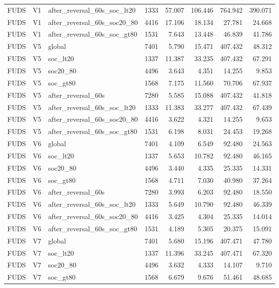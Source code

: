 \begin{tabular}{lllrrrrr}
FUDS & V1 & after\_reversal\_60s\_soc\_lt20 & 1333 & 57.007 & 106.446 & 764.942 & 390.071 \\
FUDS & V1 & after\_reversal\_60s\_soc20\_80 & 4416 & 17.106 & 18.134 & 27.781 & 24.668 \\
FUDS & V1 & after\_reversal\_60s\_soc\_gt80 & 1531 & 7.643 & 13.448 & 46.839 & 41.786 \\
FUDS & V5 & global & 7401 & 5.790 & 15.471 & 407.432 & 48.312 \\
FUDS & V5 & soc\_lt20 & 1337 & 11.387 & 33.235 & 407.432 & 67.291 \\
FUDS & V5 & soc20\_80 & 4496 & 3.643 & 4.351 & 14.255 & 9.853 \\
FUDS & V5 & soc\_gt80 & 1568 & 7.175 & 11.560 & 70.706 & 67.937 \\
FUDS & V5 & after\_reversal\_60s & 7280 & 5.585 & 15.088 & 407.432 & 41.818 \\
FUDS & V5 & after\_reversal\_60s\_soc\_lt20 & 1333 & 11.383 & 33.277 & 407.432 & 67.439 \\
FUDS & V5 & after\_reversal\_60s\_soc20\_80 & 4416 & 3.622 & 4.321 & 14.255 & 9.653 \\
FUDS & V5 & after\_reversal\_60s\_soc\_gt80 & 1531 & 6.198 & 8.031 & 24.453 & 19.268 \\
FUDS & V6 & global & 7401 & 4.109 & 6.549 & 92.480 & 24.563 \\
FUDS & V6 & soc\_lt20 & 1337 & 5.653 & 10.782 & 92.480 & 46.165 \\
FUDS & V6 & soc20\_80 & 4496 & 3.440 & 4.335 & 25.335 & 14.331 \\
FUDS & V6 & soc\_gt80 & 1568 & 4.711 & 7.030 & 40.980 & 37.264 \\
FUDS & V6 & after\_reversal\_60s & 7280 & 3.993 & 6.203 & 92.480 & 18.550 \\
FUDS & V6 & after\_reversal\_60s\_soc\_lt20 & 1333 & 5.649 & 10.790 & 92.480 & 46.339 \\
FUDS & V6 & after\_reversal\_60s\_soc20\_80 & 4416 & 3.425 & 4.304 & 25.335 & 14.014 \\
FUDS & V6 & after\_reversal\_60s\_soc\_gt80 & 1531 & 4.189 & 5.305 & 20.375 & 15.091 \\
FUDS & V7 & global & 7401 & 5.680 & 15.196 & 407.471 & 47.780 \\
FUDS & V7 & soc\_lt20 & 1337 & 11.396 & 33.245 & 407.471 & 67.320 \\
FUDS & V7 & soc20\_80 & 4496 & 3.632 & 4.333 & 14.107 & 9.710 \\
FUDS & V7 & soc\_gt80 & 1568 & 6.679 & 9.676 & 51.461 & 48.685 \\

\end{tabular}
